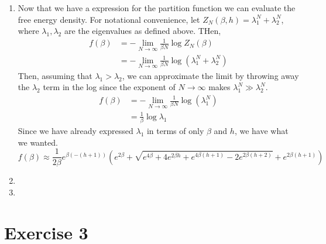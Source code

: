 \documentclass[11pt]{article}
\theoremstyle{definition}
\begin{document}
\begin{enumerate}
\item 
Now that we have a expression for the partition function we can evaluate the free energy density. For notational convenience, let $Z_N(\beta, h) = \lambda_1^N + \lambda_2^N$, where $\lambda_1, \lambda_2$ are the eigenvalues as defined above. THen,
\begin{align*}
	f(\beta) 
	&= -\lim_{N \to \infty} \frac{1}{\beta N} \log Z_N(\beta) \\
	&= -\lim_{N \to \infty} \frac{1}{\beta N} \log (\lambda_1^N + \lambda_2^N)
\end{align*}
Then, assuming that $\lambda_1 > \lambda_2$, we can approximate the limit by throwing away the $\lambda_2$ term in the log since the exponent of $N\to \infty$ makes $\lambda_1^N \gg \lambda_2^N$. 
\begin{align*}
	f(\beta) 
	&= -\lim_{N \to \infty} \frac{1}{\beta N }\log (\lambda_1^N) \\
	&= \frac{1}{\beta}\log \lambda_1
\end{align*}
Since we have already expressed $\lambda_1$ in terms of only $\beta$ and $h$, we have what we wanted.
\[ \boxed{f(\beta) \approx  \frac{1}{2\beta} e^{\beta  (-(h+1))} \left(e^{2 \beta }+\sqrt{e^{4 \beta }+4 e^{2 \beta  h}+e^{4 \beta  (h+1)}-2 e^{2 \beta  (h+2)}}+e^{2 \beta  (h+1)}\right) }\]

\item

\item
\end{enumerate}


\newpage
\section{Exercise 3}
\end{document}
